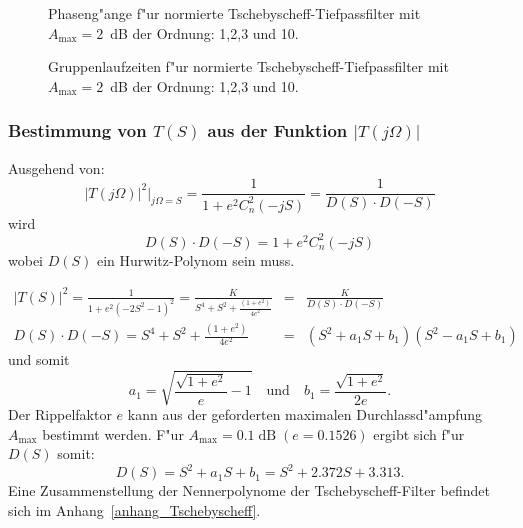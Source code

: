 \begin{figure}[!htb]%
\begin{center}\vspace*{-6mm} 
  \vspace*{-3mm}\caption{Phaseng"ange f"ur normierte Tschebyscheff-Tiefpassfilter mit $A_{\text{max}}=2$~dB der Ordnung: 1,2,3 und 10.}
\end{center}
\vspace*{-6mm} 
\end{figure}

\clearpage


\begin{figure}[!htb]%
\begin{center}\vspace*{-0mm} 
  \vspace*{-3mm}\caption{Gruppenlaufzeiten f"ur normierte Tschebyscheff-Tiefpassfilter mit $A_{\text{max}}=2$~dB der Ordnung: 1,2,3 und 10.}
\end{center}
\vspace*{-6mm} 
\end{figure}


\subsubsection{{\boldmath Bestimmung von $T(S)$ aus der Funktion $|T(j\Omega)|$}}
Ausgehend von:
\begin{equation}
|T(j\Omega)|^{2}|_{j\Omega=S}=\frac{1}{1+e^{2}C_{n}^{2}(-jS)}
=\frac{1}{D(S)\cdot D(-S)}
\end{equation}
wird
\begin{equation}
D(S) \cdot D(-S)=1 + e^{2}C_{n}^{2}(-jS)    
\end{equation}
wobei $D(S)$ ein Hurwitz-Polynom sein muss.

\begin{eqnarray*}
|T(S)|^{2}=\frac{1}{1+e^{2}(-2S^{2}-1)^{2}}=
\frac{K}{S^{4}+S^{2}+\frac{(1+e^{2})}{4e^{2}}}&=&\frac{K}{D(S)\cdot D(-S)}\\
D(S)\cdot D(-S)=S^{4}+S^{2}+\frac{(1 + e^{2})}{4e^{2}}&=&(S^{2}+a_{1}S+b_{1})(S^{2}-a_{1}S+b_{1})
\end{eqnarray*}
und somit
\begin{equation*}
a_{1}=\sqrt{\frac{\sqrt{1+e^{2}}}{e}-1} \quad \mbox{und} \quad
b_{1}=\frac{\sqrt{1+e^{2}}}{2e}.
\end{equation*}
Der Rippelfaktor $e$ kann aus der geforderten maximalen
Durchlassd"ampfung $A_{\max}$ bestimmt werden.  F"ur
$A_{\max}=0.1\;\text{dB}\;(e=0.1526)$ ergibt sich f"ur $D(S)$ somit:
\begin{equation*}
D(S)=S^{2}+a_{1}S+b_{1}=S^{2}+2.372 S+3.313.
\end{equation*}
Eine Zusammenstellung der Nennerpolynome der Tschebyscheff-Filter befindet
sich im Anhang~\ref{anhang_Tschebyscheff}.
